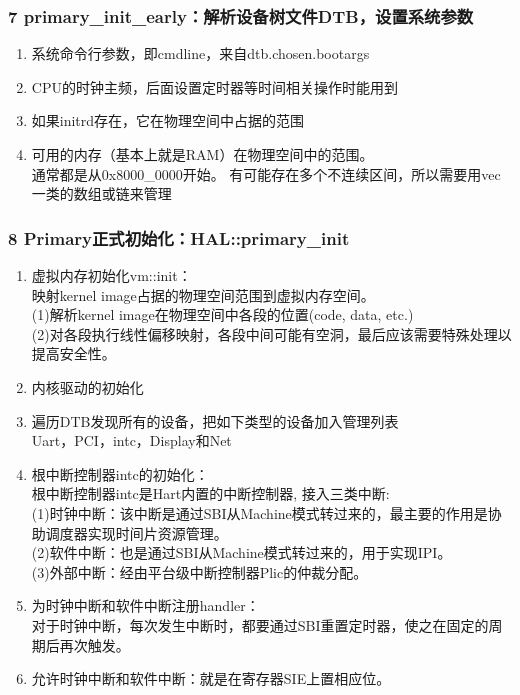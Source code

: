 \documentclass[
8pt, %
]{beamer}
\begin{document}
	\begin{frame}
		\frametitle{7 primary\_init\_early：解析设备树文件DTB，设置系统参数}
		\begin{enumerate}
			\item 系统命令行参数，即cmdline，来自dtb.chosen.bootargs
			\item CPU的时钟主频，后面设置定时器等时间相关操作时能用到
			\item 如果initrd存在，它在物理空间中占据的范围
			\item 可用的内存（基本上就是RAM）在物理空间中的范围。\\
			通常都是从0x8000\_0000开始。
			有可能存在多个不连续区间，所以需要用vec一类的数组或链来管理
		\end{enumerate}
	\end{frame}

	\begin{frame}
		\frametitle{8 Primary正式初始化：HAL::primary\_init}
		\begin{enumerate}
			\item 虚拟内存初始化vm::init：\\
			映射kernel image占据的物理空间范围到虚拟内存空间。\\
			(1)解析kernel image在物理空间中各段的位置(code, data, etc.)\\
			(2)对各段执行线性偏移映射，各段中间可能有空洞，最后应该需要特殊处理以提高安全性。
			\item 内核驱动的初始化
			\item 遍历DTB发现所有的设备，把如下类型的设备加入管理列表\\
			Uart，PCI，intc，Display和Net
			\item 根中断控制器intc的初始化：\\
			根中断控制器intc是Hart内置的中断控制器, 接入三类中断: \\
			(1)时钟中断：该中断是通过SBI从Machine模式转过来的，最主要的作用是协助调度器实现时间片资源管理。\\
			(2)软件中断：也是通过SBI从Machine模式转过来的，用于实现IPI。\\
			(3)外部中断：经由平台级中断控制器Plic的仲裁分配。\\
			\item 为时钟中断和软件中断注册handler：\\
			对于时钟中断，每次发生中断时，都要通过SBI重置定时器，使之在固定的周期后再次触发。
			\item 允许时钟中断和软件中断：就是在寄存器SIE上置相应位。
		\end{enumerate}
	\end{frame}
\end{document}

